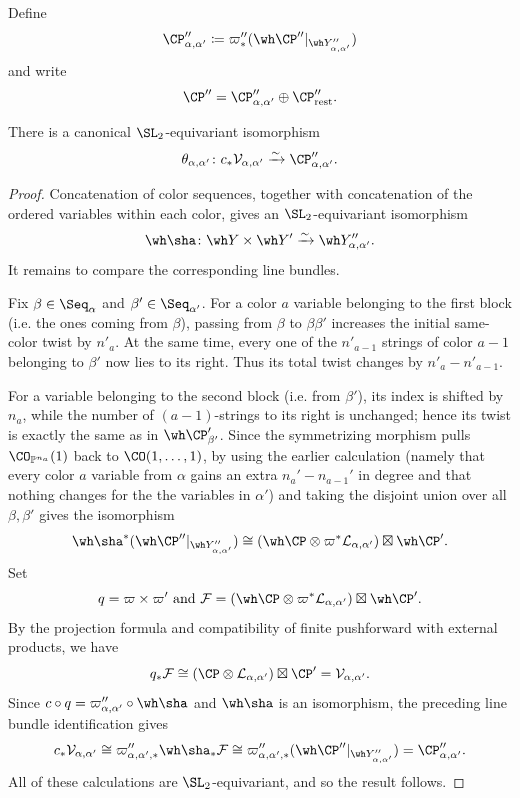 \documentclass[11pt,reqno]{amsart}
\begin{document}
Define \[\CP''_{\alpha,\alpha'}\coloneqq \varpi''_*(\wh\CP''|_{\wh Y''_{\alpha,\alpha'}})\] and write  \[\CP''=\CP''_{\alpha,\alpha'}\oplus\CP''_{\mathrm{rest}}.\] \begin{lemma}\label{lem:monoidal-polynomial-sheaf}
There is a canonical $\SL_2$-equivariant isomorphism
\[\theta_{\alpha,\alpha'}\colon c_*\mathcal V_{\alpha,\alpha'} \xrightarrow{\sim}\CP''_{\alpha,\alpha'}.\]
\end{lemma}
\begin{proof} Concatenation of color sequences, together with concatenation of the
ordered variables within each color, gives an $\SL_2$-equivariant
isomorphism
\[\wh\sha \colon\wh Y\times\wh Y'\xrightarrow{\sim}\wh Y''_{\alpha,\alpha'}.\]
It remains to compare the corresponding line bundles. 

Fix $\beta\in\Seq_\alpha$ and $\beta'\in\Seq_{\alpha'}$. For a color $a$ variable belonging to the first
block (i.e. the ones coming from $\beta$), passing from $\beta$ to $\beta\beta'$ increases the initial
same-color twist by $n'_a$. At the same time, every one of the
$n'_{a-1}$ strings of color $a-1$ belonging to $\beta'$ now lies to
its right. Thus its total twist changes by $n'_a-n'_{a-1}.$

For a variable belonging to the second block (i.e. from $\beta'$), its index is shifted by
$n_a$, while the number of $(a-1)$-strings to its right is unchanged;
hence its twist is exactly the same as in $\wh\CP'_{\beta'}$. Since the symmetrizing morphism pulls
$\CO_{\BP^{n_a}}(1)$ back to $\CO(1,\ldots,1)$, by using the earlier calculation (namely that every color $a$ variable from $\alpha$ gains an extra $n_a'-n_{a-1}'$ in degree and that nothing changes for the the variables in $\alpha'$) and taking the disjoint union over all $\beta,\beta'$ gives the isomorphism
\[\wh\sha^*(\wh\CP''|_{\wh Y''_{\alpha,\alpha'}})\cong
(\wh\CP\otimes\varpi^*\mathcal L_{\alpha,\alpha'})
\boxtimes\wh\CP'.
\] Set
\[q=\varpi\times\varpi' \text{ and }\mathcal F=(\wh\CP\otimes\varpi^*\mathcal L_{\alpha,\alpha'})\boxtimes\wh\CP'.\]
By the projection formula and compatibility of finite pushforward with
external products, we have
\[q_*\mathcal F
\cong
(\CP\otimes\mathcal L_{\alpha,\alpha'})\boxtimes\CP'
=
\mathcal V_{\alpha,\alpha'}.
\]
Since
$c\circ q=\varpi''_{\alpha,\alpha'}\circ\wh\sha$ and
$\wh\sha$ is an isomorphism, the preceding line bundle
identification gives \[c_*\mathcal V_{\alpha,\alpha'}\cong
\varpi''_{\alpha,\alpha',*}\wh\sha_*\mathcal F\cong
\varpi''_{\alpha,\alpha',*}(
\wh\CP''|_{\wh Y''_{\alpha,\alpha'}})=\CP''_{\alpha,\alpha'}.\]All of these calculations are $\SL_2$-equivariant, and so the result follows.\end{proof}
\end{document}
